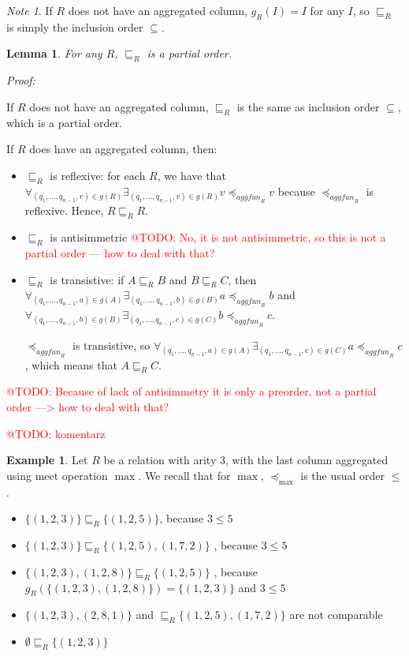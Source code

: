 \documentclass{pracamgr}
\makeatletter
\theoremstyle{plain}
\newtheorem{lem}[thm]{Lemma}
\theoremstyle{definition}
\newtheorem{exmp}{Example}[section]
\theoremstyle{remark}
\newtheorem*{note}{Note}
\newcommand{\todo}[1]{\textcolor{red}{@TODO: #1}}
\newcommand{\aggfun}{\textit{aggfun} }
\makeatother
\begin{document}
\begin{note}
If $R$ does not have an aggregated column, $g_R(I) = I$ for any $I$, so $\sqsubseteq_R$ is simply the inclusion order $\subseteq$. 
\end{note}

\begin{lem}
For any $R$, $\sqsubseteq_R$ is a partial order.
\end{lem}

\emph{Proof:}

If $R$ does not have an aggregated column, $\sqsubseteq_R$ is the same as inclusion order $\subseteq$, which is a partial order.

If $R$ does have an aggregated column, then:

\begin{itemize}
\item $\sqsubseteq_R$ is reflexive: for each $R$, we have that  $\forall_{(q_1, ..., q_{n-1}, v) \in g(R)} \exists_{(q_1, ..., q_{n-1}, v) \in g(R)} v \preceq_{\aggfun_R} v $ because $\preceq_{\aggfun_R}$ is reflexive. Hence, $R \sqsubseteq_R R$.
\item $\sqsubseteq_R$ is antisimmetric \todo{No, it is not antisimmetric, so this is not a partial order --- how to deal with that?}
\item $\sqsubseteq_R$ is transistive: if $A \sqsubseteq_R B$ and $B \sqsubseteq_R  C$, then $\forall_{(q_1, ..., q_{n-1}, a) \in g(A)} \exists_{(q_1, ..., q_{n-1}, b) \in g(B)} a \preceq_{\aggfun_R} b $ and $\forall_{(q_1, ..., q_{n-1}, b) \in g(B)} \exists_{(q_1, ..., q_{n-1}, c) \in g(C)} b \preceq_{\aggfun_R} c$.

$\preceq_{\aggfun_R}$ is transistive, so $\forall_{(q_1, ..., q_{n-1}, a) \in g(A)} \exists_{(q_1, ..., q_{n-1}, c) \in g(C)} a \preceq_{\aggfun_R} c $, which means that $A \sqsubseteq_R C$.
\end{itemize}

\todo{Because of lack of antisimmetry it is only a preorder, not a partial order ---> how to deal with that?}

\todo{komentarz}

\begin{exmp}
Let $R$ be a relation with arity $3$, with the last column aggregated using meet operation $\max$.
We recall that for $ \max $, $ \preceq_{\max} $ is the usual order $ \le $.
\begin{itemize}
\item $\{(1, 2, 3)\} \sqsubseteq_R \{(1, 2, 5)\}$, because $3 \le 5$
\item $\{(1, 2, 3)\} \sqsubseteq_R \{(1, 2, 5), (1, 7, 2)\}$ , because $3 \le 5$
\item $\{(1, 2, 3), (1, 2, 8)\} \sqsubseteq_R \{(1, 2, 5)\}$ , because $g_R(\{(1, 2, 3), (1, 2, 8)\}) = \{(1,2,3)\}$ and $3 \le 5$
\item $\{(1, 2, 3), (2, 8, 1)\}$ and  $\sqsubseteq_R \{(1, 2, 5), (1, 7, 2)\}$ are not comparable
\item $\emptyset \sqsubseteq_R \{(1, 2, 3)\}$
\end{itemize}
\end{exmp}
\end{document}
